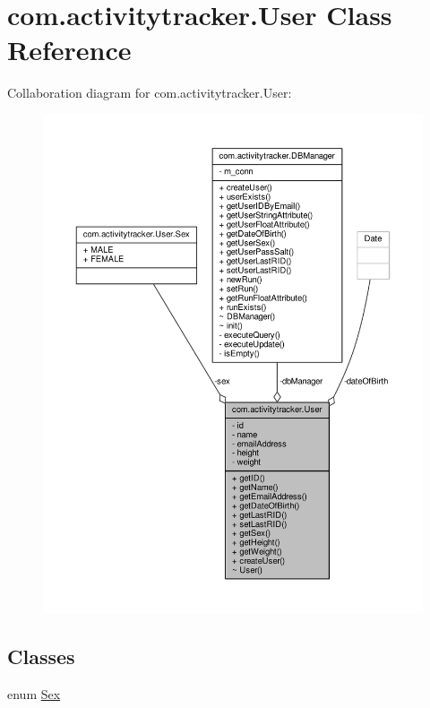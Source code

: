 \hypertarget{classcom_1_1activitytracker_1_1_user}{}\section{com.\+activitytracker.\+User Class Reference}
\label{classcom_1_1activitytracker_1_1_user}


Collaboration diagram for com.\+activitytracker.\+User\+:
\nopagebreak
\begin{figure}[H]
\begin{center}
\leavevmode
\includegraphics[width=350pt]{classcom_1_1activitytracker_1_1_user__coll__graph}
\end{center}
\end{figure}
\subsection*{Classes}
\begin{DoxyCompactItemize}
\item 
enum \hyperlink{enumcom_1_1activitytracker_1_1_user_1_1_sex}{Sex}
\end{DoxyCompactItemize}
